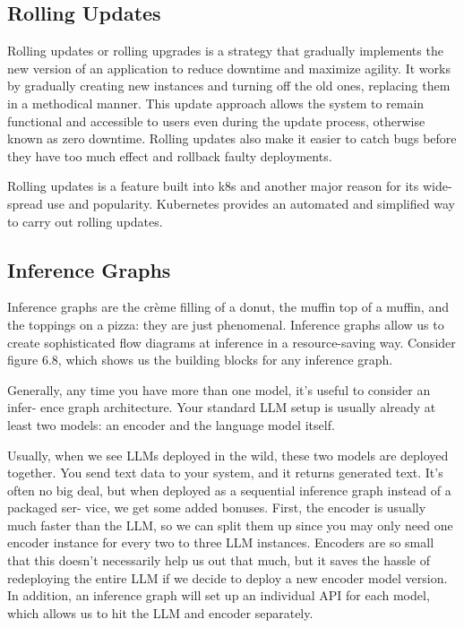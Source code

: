\subsection{Rolling Updates}

Rolling updates or rolling upgrades is a strategy that gradually implements the new version of an application to reduce downtime and maximize agility. It works by gradually creating new instances and turning off the old ones, replacing them in a methodical manner. This update approach allows the system to remain functional and accessible to users even during the update process, otherwise known as zero downtime. Rolling updates also make it easier to catch bugs before they have too much effect and rollback faulty deployments. 

Rolling updates is a feature built into k8s and another major reason for its wide-spread use and popularity. Kubernetes provides an automated and simplified way to carry out rolling updates. 

\subsection{Inference Graphs}

Inference graphs are the crème filling of a donut, the muffin top of a muffin, and the toppings on a pizza: they are just phenomenal. Inference graphs allow us to create sophisticated flow diagrams at inference in a resource-saving way. Consider figure 6.8, which shows us the building blocks for any inference graph. 

Generally, any time you have more than one model, it's useful to consider an infer- ence graph architecture. Your standard LLM setup is usually already at least two models: an encoder and the language model itself.

 Usually, when we see LLMs deployed in the wild, these two models are deployed together. You send text data to your system, and it returns generated text. It's often no big deal, but when deployed as a sequential inference graph instead of a packaged ser- vice, we get some added bonuses. First, the encoder is usually much faster than the LLM, so we can split them up since you may only need one encoder instance for every two to three LLM instances. Encoders are so small that this doesn't necessarily help us out that much, but it saves the hassle of redeploying the entire LLM if we decide to deploy a new encoder model version. In addition, an inference graph will set up an individual API for each model, which allows us to hit the LLM and encoder separately.

